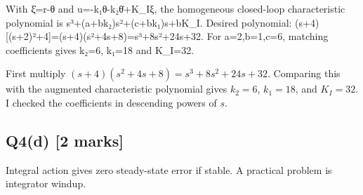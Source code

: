 \documentclass[11pt,a4paper]{article}
\begin{document}
With ξ̇=r-θ and u=-k₁θ-k₂θ̇+K\_Iξ, the homogeneous closed-loop characteristic polynomial is s³+(a+bk₂)s²+(c+bk₁)s+bK\_I.
Desired polynomial: (s+4)[(s+2)²+4]=(s+4)(s²+4s+8)=s³+8s²+24s+32.
For a=2,b=1,c=6, matching coefficients gives k₂=6, k₁=18 and K\_I=32.\par\smallskip First multiply $(s+4)(s^2+4s+8)=s^3+8s^2+24s+32$. Comparing this with the augmented characteristic polynomial gives $k_2=6$, $k_1=18$, and $K_I=32$. I checked the coefficients in descending powers of $s$.

\subsection*{Q4(d) \hfill [2 marks]}

Integral action gives zero steady-state error if stable.
A practical problem is integrator windup.
\end{document}
